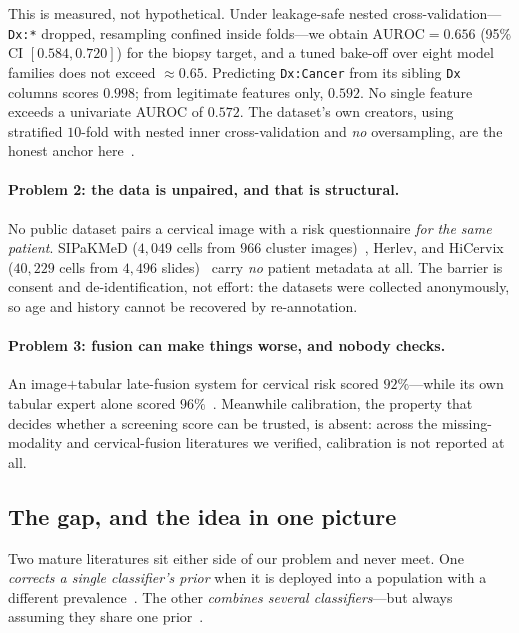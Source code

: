 \documentclass[sigplan,nonacm,screen]{acmart}
\begin{document}
This is measured, not hypothetical. Under leakage-safe nested cross-validation---\texttt{Dx:*} dropped, resampling confined inside folds---we obtain $\mathrm{AUROC}=0.656$ (95\% CI $[0.584, 0.720]$) for the biopsy target, and a tuned bake-off over eight model families does not exceed $\approx0.65$. Predicting \texttt{Dx:Cancer} from its sibling \texttt{Dx} columns scores $0.998$; from legitimate features only, $0.592$. No single feature exceeds a univariate AUROC of $0.572$. The dataset's own creators, using stratified $10$-fold with nested inner cross-validation and \emph{no} oversampling, are the honest anchor here~\cite{fernandes2018supervised}.

\paragraph{Problem 2: the data is unpaired, and that is structural.}
No public dataset pairs a cervical image with a risk questionnaire \emph{for the same patient}. SIPaKMeD ($4{,}049$ cells from $966$ cluster images)~\cite{plissiti2018sipakmed}, Herlev, and HiCervix ($40{,}229$ cells from $4{,}496$ slides)~\cite{cai2024hicervix} carry \emph{no} patient metadata at all. The barrier is consent and de-identification, not effort: the datasets were collected anonymously, so age and history cannot be recovered by re-annotation.

\paragraph{Problem 3: fusion can make things worse, and nobody checks.}
An image$+$tabular late-fusion system for cervical risk scored $92\%$---while its own tabular expert alone scored $96\%$~\cite{kelebet2025multimodal}. Meanwhile calibration, the property that decides whether a screening score can be trusted, is absent: across the missing-modality and cervical-fusion literatures we verified, calibration is not reported at all.

\subsection{The gap, and the idea in one picture}

Two mature literatures sit either side of our problem and never meet. One \emph{corrects a single classifier's prior} when it is deployed into a population with a different prevalence~\cite{saerens2002adjusting,godau2023deployment,alexandari2020maximum}. The other \emph{combines several classifiers}---but always assuming they share one prior~\cite{kittler1998combining,genest1986combining,chen2022proben}.
\end{document}
